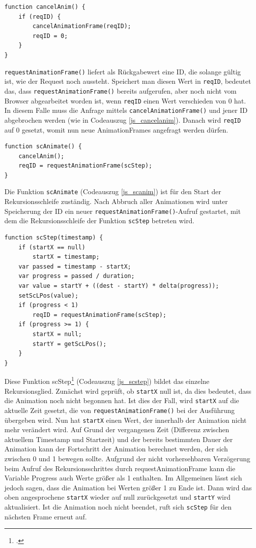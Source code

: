 \begin{lstlisting}[caption=Die Funktion cancelAnim., label=js_cancelanim]
function cancelAnim() {
	if (reqID) {
		cancelAnimationFrame(reqID);
		reqID = 0;
	}
}
\end{lstlisting}

\lstinline{requestAnimationFrame()} liefert als Rückgabewert eine ID, die solange gültig ist, wie der Request noch aussteht. Speichert man diesen Wert in \lstinline{reqID}, bedeutet das, dass \lstinline{requestAnimationFrame()} bereits aufgerufen, aber noch nicht vom Browser abgearbeitet worden ist, wenn \lstinline{reqID} einen Wert verschieden von 0 hat. In diesem Falle muss die Anfrage mittels \lstinline{cancelAnimationFrame()} und jener ID abgebrochen werden (wie in Codeauszug \ref{js_cancelanim}). Danach wird \lstinline{reqID} auf 0 gesetzt, womit nun neue AnimationFrames angefragt werden dürfen.

\begin{lstlisting}[caption=Die Funktion scAnim., label=js_scanim]
function scAnimate() {
	cancelAnim();
	reqID = requestAnimationFrame(scStep);
}
\end{lstlisting}

Die Funktion \lstinline{scAnimate} (Codeauszug \ref{js_scanim}) ist für den Start der Rekursionsschleife zuständig. Nach Abbruch aller Animationen wird unter Speicherung der ID ein neuer \lstinline{requestAnimationFrame()}-Aufruf gestartet, mit dem die Rekursionsschleife der Funktion \lstinline{scStep} betreten wird.

\begin{lstlisting}[caption=Die Funktion scStep., label=js_scstep]
function scStep(timestamp) {
	if (startX == null)
		startX = timestamp;
	var passed = timestamp - startX;
	var progress = passed / duration;
	var value = startY + ((dest - startY) * delta(progress));
	setScLPos(value);
	if (progress < 1)
		reqID = requestAnimationFrame(scStep);
	if (progress >= 1) {
		startX = null;
		startY = getScLPos();
	}
}
\end{lstlisting}

Diese Funktion scStep\footcite[vgl.][]{rAF} (Codeauszug \ref{js_scstep}) bildet das einzelne Rekursionsglied. Zunächst wird geprüft, ob \lstinline{startX} null ist, da dies bedeutet, dass die Animation noch nicht begonnen hat. Ist dies der Fall, wird \lstinline{startX} auf die aktuelle Zeit gesetzt, die von \lstinline{requestAnimationFrame()} bei der Ausführung übergeben wird. Nun hat \lstinline{startX} einen Wert, der innerhalb der Animation nicht mehr verändert wird. Auf Grund der vergangenen Zeit (Differenz zwischen aktuellem Timestamp und Startzeit) und der bereits bestimmten Dauer der Animation kann der Fortschritt der Animation berechnet werden, der sich zwischen 0 und 1 bewegen sollte. Aufgrund der nicht vorhersehbaren Verzögerung beim Aufruf des Rekursionsschrittes durch requestAnimationFrame kann die Variable Progress auch Werte größer als 1 enthalten. Im Allgemeinen lässt sich jedoch sagen, dass die Animation bei Werten größer 1 zu Ende ist. Dann wird das oben angesprochene \lstinline{startX} wieder auf null zurückgesetzt und \lstinline{startY} wird aktualisiert. Ist die Animation noch nicht beendet, ruft sich \lstinline{scStep} für den nächsten Frame erneut auf.

